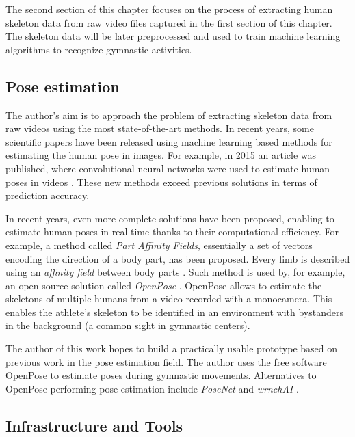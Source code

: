 The second section of this chapter focuses on the process of extracting human skeleton data from raw video files captured in the first section of this chapter. The skeleton data will be later preprocessed and used to train machine learning algorithms to recognize gymnastic activities.

\subsection{Pose estimation}

The author's aim is to approach the problem of extracting skeleton data from raw videos using the most state-of-the-art methods. In recent years, some scientific papers have been released using machine learning based methods for estimating the human pose in images. For example, in 2015 an article was published, where convolutional neural networks were used to estimate human poses in videos \cite{poseestimation2015convnets}. These new methods exceed previous solutions in terms of prediction accuracy.

In recent years, even more complete solutions have been proposed, enabling to estimate human poses in real time thanks to their computational efficiency. For example, a method called \textit{Part Affinity Fields}, essentially a set of vectors encoding the direction of a body part, has been proposed. Every limb is described using an \textit{affinity field} between body parts \cite{cao2016realtime}. Such method is used by, for example, an open source solution called \textit{OpenPose} \cite{cao2018openpose}. OpenPose allows to estimate the skeletons of multiple humans from a video recorded with a monocamera. This enables the athlete's skeleton to be identified in an environment with bystanders in the background (a common sight in gymnastic centers).

The author of this work hopes to build a practically usable prototype based on previous work in the pose estimation field. The author uses the free software OpenPose to estimate poses during gymnastic movements. Alternatives to OpenPose performing pose estimation include \textit{PoseNet} \cite{posenet} and \textit{wrnchAI} \cite{wrnchai}.

\subsection{Infrastructure and Tools}

